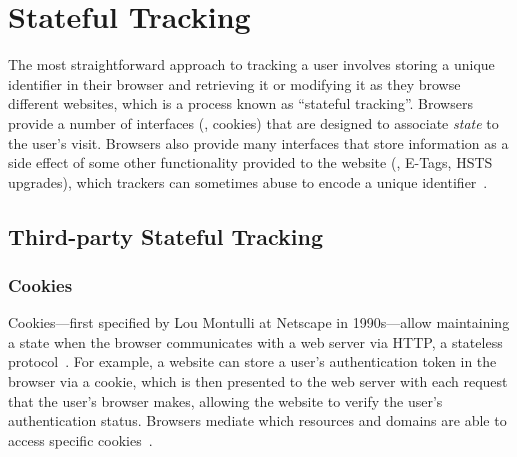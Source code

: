 \section{Stateful Tracking}
\label{sec:stateful-tracking}
\vspace{-1mm}
The most straightforward approach to tracking a user involves storing a unique identifier in their browser and retrieving it or modifying it as they browse different websites, which is a process known as ``stateful tracking''. 
%
Browsers provide a number of interfaces (\eg{}, cookies) that are designed to associate \textit{state} to the user's visit. 
%
Browsers also provide many interfaces that store information as a side effect of some other functionality provided to the website (\eg{}, E-Tags, HSTS upgrades), which trackers can sometimes abuse to encode a unique identifier~\cite{englehardtAutomatedDiscoveryPrivacy2018,ashkansoltaniFlashCookiesPrivacy2011,solomosTalesFaviconsCaches2021}.
%




\subsection{Third-party Stateful Tracking}
\label{sec:tp-stateful}

\vspace{-1mm}
\subsubsection{Cookies} Cookies---first specified by Lou Montulli at Netscape in 1990s---allow maintaining a state when the browser communicates with a web server via HTTP, a stateless protocol~\cite{kristolHTTPCookiesStandards2001}. 
%
For example, a website can store a user’s authentication token in the browser via a cookie, which is then presented to the web server with each request that the user’s browser makes, allowing the website to verify the user’s authentication status. 
%
Browsers mediate which resources and domains are able to access specific cookies~\cite{beugin2024WebAlmanac2024,singhIncoherenciesWebBrowser2010,mdnSameoriginPolicySecurity2024}.


